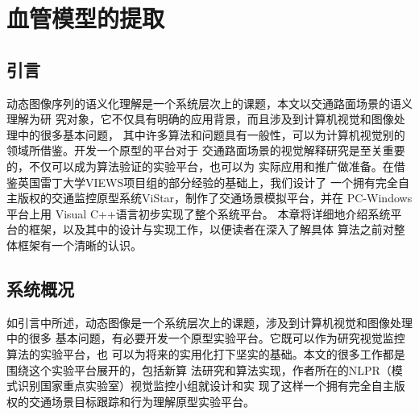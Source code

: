 \chapter{血管模型的提取}
\label{chap3} \fontsize{12pt}{12pt}\selectfont

\section{引言}

动态图像序列的语义化理解是一个系统层次上的课题，本文以交通路面场景的语义理解为研
究对象，它不仅具有明确的应用背景，而且涉及到计算机视觉和图像处理中的很多基本问题，
其中许多算法和问题具有一般性，可以为计算机视觉别的领域所借鉴。开发一个原型的平台对于
交通路面场景的视觉解释研究是至关重要的，不仅可以成为算法验证的实验平台，也可以为
实际应用和推广做准备。在借鉴英国雷丁大学VIEWS项目组的部分经验的基础上，我们设计了
一个拥有完全自主版权的交通监控原型系统ViStar，制作了交通场景模拟平台，并在
PC-Windows平台上用 Visual C++语言初步实现了整个系统平台。
本章将详细地介绍系统平台的框架，以及其中的设计与实现工作，以便读者在深入了解具体
算法之前对整体框架有一个清晰的认识。

\section{系统概况}

如引言中所述，动态图像是一个系统层次上的课题，涉及到计算机视觉和图像处理中的很多
基本问题，有必要开发一个原型实验平台。它既可以作为研究视觉监控算法的实验平台，也
可以为将来的实用化打下坚实的基础。本文的很多工作都是围绕这个实验平台展开的，包括新算
法研究和算法实现，作者所在的NLPR（模式识别国家重点实验室）视觉监控小组就设计和实
现了这样一个拥有完全自主版权的交通场景目标跟踪和行为理解原型实验平台。
